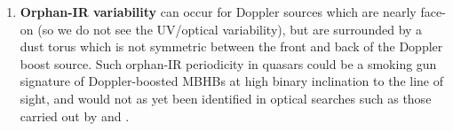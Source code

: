 \begin{enumerate}
{}


\item{

\textbf{Orphan-IR variability} can occur for Doppler sources which are nearly
face-on (so we do not see the UV/optical variability), but are surrounded by a
dust torus which is not symmetric between the front and back of the Doppler
boost source. Such orphan-IR periodicity in quasars could be a smoking gun
signature of Doppler-boosted MBHBs at high binary inclination to the line of sight,
and would not as yet been identified in optical searches such as those carried
out by \cite{Graham+2015b} and \cite{Charisi+2016}. 

}





\end{enumerate}


 


